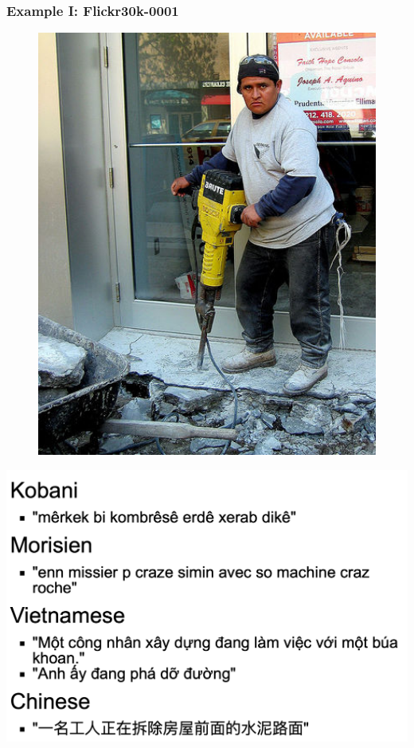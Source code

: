 \documentclass[aspectratio=169]{beamer}
\begin{document}
\begin{frame}[fragile]
	\frametitle{Example I: Flickr30k-0001}
    \begin{minipage}{.50\textwidth}
    \begin{figure}
        \centering
        \includegraphics[width=1.0\textwidth]{images/13651137.jpg} 
    \end{figure}
    \end{minipage}%
    \begin{minipage}{.50\textwidth}
    \includegraphics[width=\textwidth]{images/example-flikr-1.png}

\end{minipage}
\end{frame}
\end{document}
